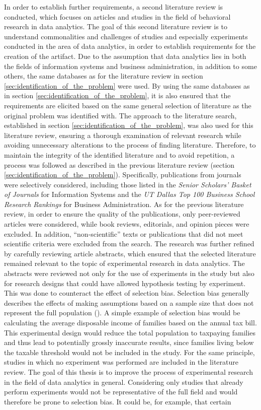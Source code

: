 In order to establish further requirements, a second literature review is conducted, which focuses on articles and studies in the field of behavioral research in data analytics. The goal of this second literature review is to understand commonalities and challenges of studies and especially experiments conducted in the area of data analytics, in order to establish requirements for the creation of the artifact. Due to the assumption that data analytics lies in both the fields of information systems and business administration, in addition to some others, the same databases as for the literature review in section \ref{sec:identification_of_the_problem} were used. By using the same databases as in section \ref{sec:identification_of_the_problem}, it is also ensured that the requirements are elicited based on the same general selection of literature as the original problem was identified with. The approach to the literature search, established in section \ref{sec:identification_of_the_problem}, was also used for this literature review, ensuring a thorough examination of relevant research while avoiding unnecessary alterations to the process of finding literature. Therefore, to maintain the integrity of the identified literature and to avoid repetition, a process was followed as described in the previous literature review (section \ref{sec:identification_of_the_problem}). Specifically, publications from journals were selectively considered, including those listed in the \textit{Senior Scholars' Basket of Journals} for Information Systems and the \textit{UT Dallas Top 100 Business School Research Rankings} for Business Administration. As for the previous literature review, in order to ensure the quality of the publications, only peer-reviewed articles were considered, while book reviews, editorials, and opinion pieces were excluded. In addition, \enquote{non-scientific} texts or publications that did not meet scientific criteria were excluded from the search. The research was further refined by carefully reviewing article abstracts, which ensured that the selected literature remained relevant to the topic of experimental research in data analytics. The abstracts were reviewed not only for the use of experiments in the study but also for research designs that could have allowed hypothesis testing by experiment. This was done to counteract the effect of selection bias. Selection bias generally describes the effects of making assumptions based on a sample size that does not represent the full population (\cite{Heckman.2010}). A simple example of selection bias would be calculating the average disposable income of families based on the annual tax bill. This experimental design would reduce the total population to taxpaying families and thus lead to potentially grossly inaccurate results, since families living below the taxable threshold would not be included in the study. For the same principle, studies in which no experiment was performed are included in the literature review. The goal of this thesis is to improve the process of experimental research in the field of data analytics in general. Considering only studies that already perform experiments would not be representative of the full field and would therefore be prone to selection bias. It could be, for example, that certain 